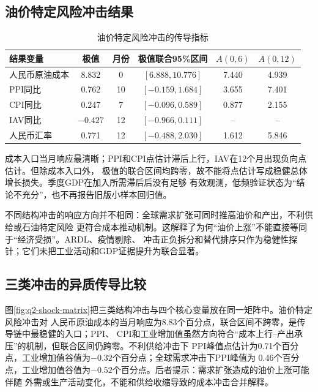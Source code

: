 \subsection{油价特定风险冲击结果}

\begin{table}[htbp]
  \centering
  \small
  \caption{油价特定风险冲击的传导指标}
  \label{tab:q2-metrics}
  \begin{tabularx}{0.98\textwidth}{Xccccc}
    \toprule
    结果变量 & 极值 & 月份 & 极值联合95\%区间 & $A(0,6)$ & $A(0,12)$ \\
    \midrule
    人民币原油成本 & 8.832 & 0 & $[6.888,10.776]$ & 7.440 & 4.939 \\
    PPI同比 & 0.762 & 10 & $[-0.159,1.684]$ & 3.655 & 7.401 \\
    CPI同比 & 0.247 & 7 & $[-0.096,0.589]$ & 0.877 & 2.155 \\
    IAV同比 & $-0.427$ & 12 & $[-0.966,0.111]$ & -- & -- \\
    人民币汇率 & 0.771 & 12 & $[-0.488,2.030]$ & 1.612 & 5.846 \\
    \bottomrule
  \end{tabularx}
\end{table}

成本入口当月响应最清晰；PPI和CPI点估计滞后上行，IAV在12个月出现负向点估计。但除成本入口外，
极值的联合区间均跨零，故不能将点估计写成稳健总体增长损失。季度GDP在加入所需滞后后没有足够
有效观测，低频验证状态为“结论不充分”，也不再报告旧版小样本回归值。

不同结构冲击的响应方向并不相同：全球需求扩张可同时推高油价和产出，不利供给或石油特定风险
更符合成本推动机制。这解释了为何“油价上涨”不能直接等同于“经济受损”。ARDL、疫情剔除、
冲击正负拆分和替代排序只作为稳健性探针；它们未把工业活动和GDP证据提升为联合显著。

\subsection{三类冲击的异质传导比较}

图\ref{fig:q2-shock-matrix}把三类结构冲击与四个核心变量放在同一矩阵中。油价特定风险冲击对
人民币原油成本的当月响应为8.83个百分点，联合区间不跨零，是传导链中最稳健的入口；PPI、
CPI和工业增加值虽然方向符合“成本上行--产出承压”的机制，但联合区间仍跨零。不利供给冲击下
PPI峰值点估计为0.71个百分点，工业增加值谷值为$-0.32$个百分点；全球需求冲击下PPI峰值为
0.46个百分点，工业增加值谷值为$-0.52$个百分点。后者提示：需求扩张造成的油价上涨可能伴随
外需或生产活动变化，不能和供给收缩导致的成本冲击合并解释。

